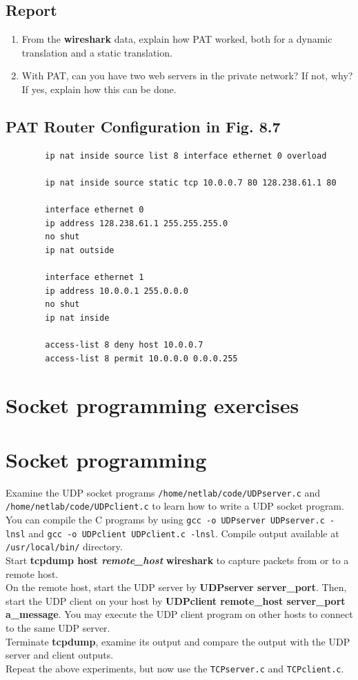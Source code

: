 \documentclass[10pt,a4paper]{article}
\numberwithin{equation}{section}
\numberwithin{figure}{section}
\numberwithin{table}{section}
\begin{document}
    \subsection*{Report}
    \begin{enumerate}
        \item From the \textbf{wireshark} data, explain how PAT worked, both for a dynamic translation and a static translation.
        \item With PAT, can you have two web servers in the private network?
        If not, why?
        If yes, explain how this can be done.
    \end{enumerate}

    \subsection*{PAT Router Configuration in Fig. 8.7}
    \begin{verbatim}
        ip nat inside source list 8 interface ethernet 0 overload

        ip nat inside source static tcp 10.0.0.7 80 128.238.61.1 80

        interface ethernet 0
        ip address 128.238.61.1 255.255.255.0
        no shut
        ip nat outside

        interface ethernet 1
        ip address 10.0.0.1 255.0.0.0
        no shut
        ip nat inside

        access-list 8 deny host 10.0.0.7
        access-list 8 permit 10.0.0.0 0.0.0.255
    \end{verbatim}

\section*{Socket programming exercises}
\section{Socket programming}
    Examine the UDP socket programs \texttt{/home/netlab/code/UDPserver.c} and \texttt{/home/netlab/code/UDPclient.c} to learn how to write a UDP socket program.
    You can compile the C programs by using \texttt{gcc -o UDPserver UDPserver.c -lnsl} and \texttt{gcc -o UDPclient UDPclient.c -lnsl}. Compile output available at \texttt{/usr/local/bin/} directory.\\
    Start \textbf{tcpdump host \textit{remote\_host}} \textbf{wireshark} to capture packets from or to a remote host. \\
    On the remote host, start the UDP server by \textbf{UDPserver server\_port}.
    Then, start the UDP client on your host by \textbf{UDPclient remote\_host server\_port a\_message}.
    You may execute the UDP client program on other hosts to connect to the same UDP server.\\
    Terminate \textbf{tcpdump}, examine its output and compare the output with the UDP server and client outputs.\\
    Repeat the above experiments, but now use the \texttt{TCPserver.c} and \texttt{TCPclient.c}.
\end{document}
